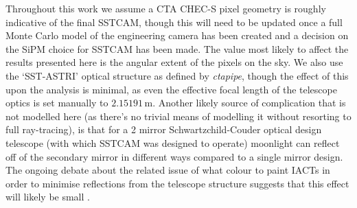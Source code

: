 Throughout this work we assume a CTA CHEC-S pixel geometry is roughly indicative of the final SSTCAM, though this will need to be updated once a full Monte Carlo model of the engineering camera has been created and a decision on the SiPM choice for SSTCAM has been made. The value most likely to affect the results presented here is the angular extent of the pixels on the sky. We also use the `SST-ASTRI' optical structure as defined by \textit{ctapipe}, though the effect of this upon the analysis is minimal, as even the effective focal length of the telescope optics is set manually to $\mathrm{2.15191\,m}$. Another likely source of complication that is not modelled here (as there's no trivial means of modelling it without resorting to full ray-tracing), is that for a 2 mirror Schwartzchild-Couder optical design telescope (with which SSTCAM was designed to operate) moonlight can reflect off of the secondary mirror in different ways compared to a single mirror design. The ongoing debate about the related issue of what colour to paint IACTs in order to minimise reflections from the telescope structure suggests that this effect will likely be small \cite{pinktelescope}.

\label{sec:examples}
